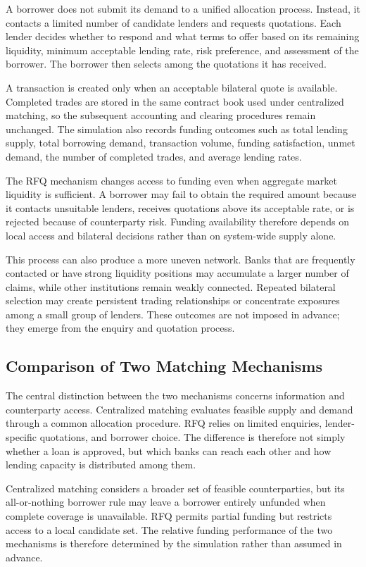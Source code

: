 A borrower does not submit its demand to a unified allocation process.
Instead, it contacts a limited number of candidate lenders and requests
quotations. Each lender decides whether to respond and what terms to
offer based on its remaining liquidity, minimum acceptable lending rate,
risk preference, and assessment of the borrower. The borrower then
selects among the quotations it has received.

A transaction is created only when an acceptable bilateral quote is
available. Completed trades are stored in the same contract book used
under centralized matching, so the subsequent accounting and clearing
procedures remain unchanged. The simulation also records funding
outcomes such as total lending supply, total borrowing demand,
transaction volume, funding satisfaction, unmet demand, the number of
completed trades, and average lending rates.

The RFQ mechanism changes access to funding even when aggregate market
liquidity is sufficient. A borrower may fail to obtain the required
amount because it contacts unsuitable lenders, receives quotations above
its acceptable rate, or is rejected because of counterparty risk.
Funding availability therefore depends on local access and bilateral
decisions rather than on system-wide supply alone.

This process can also produce a more uneven network. Banks that are
frequently contacted or have strong liquidity positions may accumulate a
larger number of claims, while other institutions remain weakly
connected. Repeated bilateral selection may create persistent trading
relationships or concentrate exposures among a small group of lenders.
These outcomes are not imposed in advance; they emerge from the enquiry
and quotation process.

\subsection{Comparison of Two Matching Mechanisms}

The central distinction between the two mechanisms concerns information
and counterparty access. Centralized matching evaluates feasible supply
and demand through a common allocation procedure. RFQ relies on limited
enquiries, lender-specific quotations, and borrower choice. The
difference is therefore not simply whether a loan is approved, but which
banks can reach each other and how lending capacity is distributed among
them.

Centralized matching considers a broader set of feasible counterparties,
but its all-or-nothing borrower rule may leave a borrower entirely
unfunded when complete coverage is unavailable. RFQ permits partial
funding but restricts access to a local candidate set. The relative
funding performance of the two mechanisms is therefore determined by the
simulation rather than assumed in advance.

